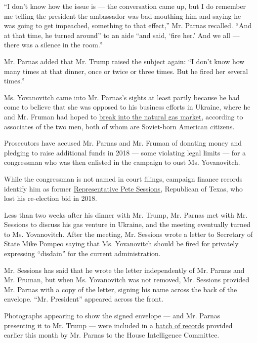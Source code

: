 ``I don't know how the issue is --- the conversation came up, but I do
remember me telling the president the ambassador was bad-mouthing him
and saying he was going to get impeached, something to that effect,''
Mr. Parnas recalled. ``And at that time, he turned around'' to an aide
``and said, `fire her.' And we all --- there was a silence in the
room.''

Mr. Parnas added that Mr. Trump raised the subject again: ``I don't know
how many times at that dinner, once or twice or three times. But he
fired her several times.''

Ms. Yovanovitch came into Mr. Parnas's sights at least partly because he
had come to believe that she was opposed to his business efforts in
Ukraine, where he and Mr. Fruman had hoped to
\href{https://www.nytimes.com/2019/10/07/us/politics/rick-perry-ukraine.html}{break
into the natural gas market}, according to associates of the two men,
both of whom are Soviet-born American citizens.

Prosecutors have accused Mr. Parnas and Mr. Fruman of donating money and
pledging to raise additional funds in 2018 --- some violating legal
limits --- for a congressman who was then enlisted in the campaign to
oust Ms. Yovanovitch.

While the congressman is not named in court filings, campaign finance
records identify him as former
\href{https://www.nytimes.com/2019/10/10/us/politics/pete-sessions-ukraine.html}{Representative
Pete Sessions}, Republican of Texas, who lost his re-election bid in
2018.

Less than two weeks after his dinner with Mr. Trump, Mr. Parnas met with
Mr. Sessions to discuss his gas venture in Ukraine, and the meeting
eventually turned to Ms. Yovanovitch. After the meeting, Mr. Sessions
wrote a letter to Secretary of State Mike Pompeo saying that Ms.
Yovanovitch should be fired for privately expressing ``disdain'' for the
current administration.

Mr. Sessions has said that he wrote the letter independently of Mr.
Parnas and Mr. Fruman, but when Ms. Yovanovitch was not removed, Mr.
Sessions provided Mr. Parnas with a copy of the letter, signing his name
across the back of the envelope. ``Mr. President'' appeared across the
front.

Photographs appearing to show the signed envelope --- and Mr. Parnas
presenting it to Mr. Trump --- were included in a
\href{https://docs.house.gov/meetings/JU/JU00/20191211/110331/HMKP-116-JU00-20191211-SD9011.pdf}{batch
of records} provided earlier this month by Mr. Parnas to the House
Intelligence Committee.

